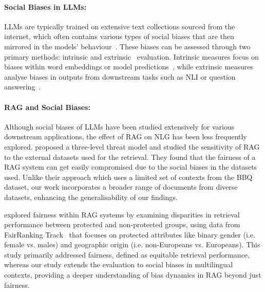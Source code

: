 \documentclass[11pt,a4paper]{article}
\begin{document}

\paragraph{Social Biases in LLMs:}
\acp{LLM} are typically trained on extensive text collections sourced from the internet, which often contains various types of social biases that are then mirrored in the models' behaviour~\cite{Penedo:2024}. 
These biases can be assessed through two primary methods: intrinsic and extrinsic~\cite{goldfarb-tarrant-etal-2021-intrinsic,cao-etal-2022-intrinsic} evaluation.
Intrinsic measures focus on biases within word embeddings or model predictions~\cite{caliskan-et-al-weat,nangia-etal-2020-crows,nadeem-etal-2021-stereoset,kaneko-etal-2022-debiasing}, while extrinsic measures analyse biases in outputs from downstream tasks such as \ac{NLI} or question answering~\cite{webster-2020-sts,De-Arteaga-biasbios}.

\paragraph{RAG and Social Biases:}
Although social biases of \acp{LLM} have been studied extensively for various downstream applications, the effect of \ac{RAG} on \ac{NLG} has been less frequently explored.
\citet{Hu:2021} proposed a three-level threat model and studied the sensitivity of \ac{RAG} to the external datasets used for the retrieval.
They found  that the fairness of a \ac{RAG} system can get easily compromised due to the social biases in the datasets used.
Unlike their approach which uses a limited set of contexts from the \ac{BBQ} dataset, our work incorporates a broader range of documents from diverse datasets, enhancing the generalisability of our findings.

\citet{wu-etal-2025-rag} explored fairness within \ac{RAG} systems by examining disparities in retrieval performance between protected and non-protected groups, using data from FairRanking Track~\citep{Ekstrand:2023} that focuses on protected attributes like binary gender (i.e. female vs. males) and geographic origin (i.e. non-Europeans vs. Europeans).
This study primarily addressed fairness, defined as equitable retrieval performance, whereas our study extends the evaluation to social biases in multilingual contexts, providing a deeper understanding of bias dynamics in \ac{RAG} beyond just fairness.
\end{document}

